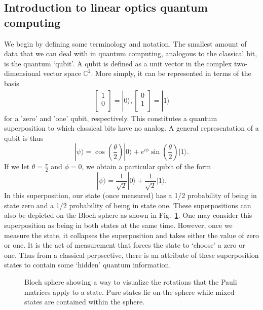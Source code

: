 \documentclass[aps,pra,twocolumn,amsmath,amssymb,nofootinbib,superscriptaddress]{revtex4}
\newcommand{\ket}[1]{|#1\rangle}
\begin{document}
\subsection{Introduction to linear optics quantum computing}
 
 We begin by defining some terminology and notation. The smallest amount of data that we can deal with in quantum computing, analogous to the classical bit, is the quantum `qubit'. A qubit is defined as a unit vector in the complex two-dimensional vector space $\mathbb{C}^2$.  More simply, it can be represented in terms of the basis
\begin{eqnarray}
 \left[ \begin{array}{l}
1 \\
0 \\
\end{array} \right] = \ket{0},
\left[ \begin{array}{l}
0 \\
1 \\
\end{array} \right] = \ket{1}
\end{eqnarray}
for a 'zero' and 'one' qubit, respectively.  This constitutes a quantum superposition to which classical bits have no analog.  A general representation of a qubit is thus
\begin{equation}
\ket{\psi} = \cos\left(\frac{\theta}{2}\right) \ket{0} + e^{i \phi} \sin\left(\frac{\theta}{2}\right)\ket{1}.
\end{equation}
 If we let $\theta =\frac{\pi}{2}$ and $\phi =0$, we obtain a particular qubit of the form
\begin{equation}
\ket{\psi}= \frac{1}{\sqrt{2}} \ket{0} + \frac{1}{\sqrt{2}} \ket{1}.
\end{equation}
In this superposition, our state (once measured) has a 1/2 probability of being in state zero and a 1/2 probability of being in state one. These superpositions can also be depicted on the Bloch sphere as shown in Fig.~\ref{fig:Bloch}. One may consider this superposition as being in both states at the same time.  However, once we measure the state, it collapses the superposition and takes either the value of zero or one. It is the act of measurement that forces the state to `choose' a zero or one. Thus from a classical perpsective, there is an attribute of these superposition states to contain some `hidden' quantum information.
\begin{figure}[bt]
 \centering
  \caption{ Bloch sphere showing a way to visualize the rotations that the Pauli matrices apply to a state. Pure states lie on the sphere while mixed states are contained within the sphere.}
  \label{fig:Bloch}
\end{figure}
\end{document}
